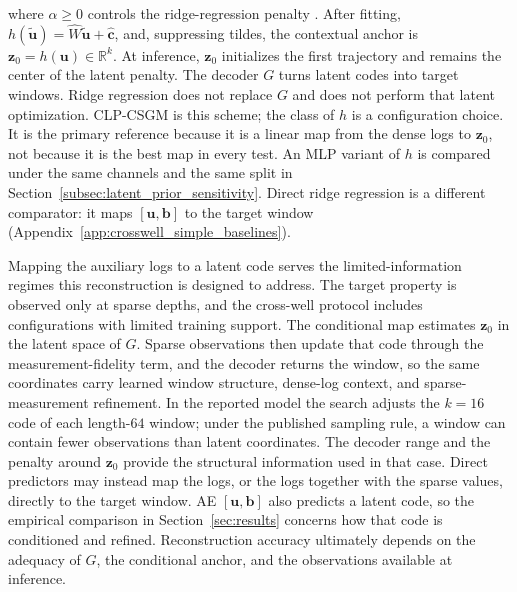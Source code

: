 where $\alpha\geq 0$ controls the ridge-regression penalty
\citep{hoerl1970ridge}. After fitting,
$h(\widetilde{\boldsymbol{u}})
=\widehat{W}\widetilde{\boldsymbol{u}}
+\widehat{\boldsymbol{c}}$, and, suppressing tildes, the contextual anchor is
$\boldsymbol{z}_0=h(\boldsymbol{u})\in\mathbb{R}^{k}$.
At inference, $\boldsymbol{z}_0$ initializes the first trajectory and
remains the center of the latent penalty. The decoder $G$ turns latent
codes into target windows. Ridge regression does not replace $G$ and does
not perform that latent optimization. CLP-CSGM is this scheme; the class of
$h$ is a configuration choice. It is the primary reference because it is a
linear map from the dense logs to $\boldsymbol{z}_0$, not because it is the
best map in every test. An MLP variant of $h$ is compared under the same
channels and the same split in Section~\ref{subsec:latent_prior_sensitivity}.
Direct ridge regression is a different comparator: it maps
$[\boldsymbol{u},\boldsymbol{b}]$ to the target window
(Appendix~\ref{app:crosswell_simple_baselines}).

Mapping the auxiliary logs to a latent code serves the limited-information
regimes this reconstruction is designed to address. The target property is
observed only at sparse depths, and the cross-well protocol includes
configurations with limited training support. The conditional map estimates
$\boldsymbol{z}_0$ in the latent space of $G$. Sparse observations then
update that code through the measurement-fidelity term, and the decoder
returns the window, so the same coordinates carry learned window structure,
dense-log context, and sparse-measurement refinement. In the reported model
the search adjusts the $k=16$ code of each length-$64$ window; under the
published sampling rule, a window can contain fewer observations than latent
coordinates. The decoder range and the penalty around $\boldsymbol{z}_0$
provide the structural information used in that case. Direct predictors may
instead map the logs, or the logs together with the sparse values, directly
to the target window. AE $[\boldsymbol{u},\boldsymbol{b}]$ also predicts a
latent code, so the empirical comparison in Section~\ref{sec:results}
concerns how that code is conditioned and refined. Reconstruction accuracy
ultimately depends on the adequacy of $G$, the conditional anchor, and the
observations available at inference.

